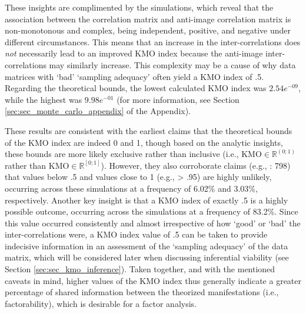 \documentclass[
  10pt,
  a4paper,
  twoside]{article}
\begin{document}
These insights are complimented by the simulations, which reveal that the association between the correlation matrix and anti-image correlation matrix is non-monotonous and complex, being independent, positive, and negative under different circumstances. This means that an increase in the inter-correlations does \emph{not} necessarily lead to an improved KMO index because the anti-image inter-correlations may similarly increase. This complexity may be a cause of why data matrices with `bad' `sampling adequacy' often yield a KMO index of .5. Regarding the theoretical bounds, the lowest calculated KMO index was \(2.54e^{-09}\), while the highest was \(9.98e^{-01}\) (for more information, see Section \ref{sec:sec_monte_carlo_appendix} of the Appendix).

These results are consistent with the earliest claims that the theoretical bounds of the KMO index are indeed 0 and 1, though based on the analytic insights, these bounds are more likely exclusive rather than inclusive (i.e., \(\text{KMO} \in \mathbb{R}^{(0; 1)}\) rather than \(\text{KMO} \in \mathbb{R}^{[0; 1]}\)). However, they also corroborate claims (e.g., : 798) that values below .5 and values close to 1 (e.g., \textgreater{} .95) are highly unlikely, occurring across these simulations at a frequency of 6.02\% and 3.03\%, respectively. Another key insight is that a KMO index of exactly .5 is a highly possible outcome, occurring across the simulations at a frequency of 83.2\%. Since this value occurred consistently and almost irrespective of how `good' or `bad' the inter-correlations were, a KMO index value of .5 can be taken to provide indecisive information in an assessment of the `sampling adequacy' of the data matrix, which will be considered later when discussing inferential viability (see Section \ref{sec:sec_kmo_inference}). Taken together, and with the mentioned caveats in mind, higher values of the KMO index thus generally indicate a greater percentage of shared information between the theorized manifestations (i.e., factorability), which is desirable for a factor analysis.
\end{document}

